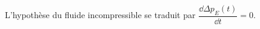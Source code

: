 %
%
%
%
% 
% 
%  
% 
%


L’hypothèse du fluide incompressible se traduit par $\dfrac{\dd \Delta p_E(t)}{\dd t}= 0$.
\fi

